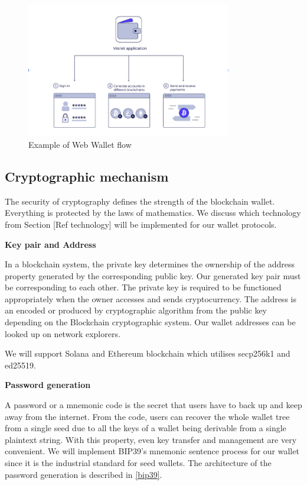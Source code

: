 \begin{figure}[ht!]
    \centering
    \includegraphics[width=0.8\textwidth]{images/webwallet.png}
    \caption[Example of Web Wallet flow]{Example of Web Wallet flow}
    \label{fig:webwallet}
\end{figure}

\subsection{Cryptographic mechanism}
The security of cryptography defines the strength of the blockchain wallet. Everything is protected by the laws of mathematics. We discuss which technology from Section [Ref technology] will be implemented for our wallet protocols.

\bigskip
{\textbf{Key pair and Address}}

In a blockchain system, the private key determines the ownership of the address property generated by the corresponding public key. Our generated key pair must be corresponding to each other. The private key is required to be functioned appropriately when the owner accesses and sends cryptocurrency. The address is an encoded or produced by cryptographic algorithm from the public key depending on the Blockchain cryptographic system. Our wallet addresses can be looked up on network explorers.

We will support Solana and Ethereum blockchain which utilises secp256k1 and ed25519.

\bigskip
{\textbf{Password generation}}

A password or a mnemonic code is the secret that users have to back up and keep away from the internet. From the code, users can recover the whole wallet tree from a single seed due to all the keys of a wallet being derivable from a single plaintext string. With this property, even key transfer and management are very convenient. We will implement BIP39's mnemonic sentence process for our wallet since it is the industrial standard for seed wallets.
The architecture of the password generation is described in \autoref{bip39}.

